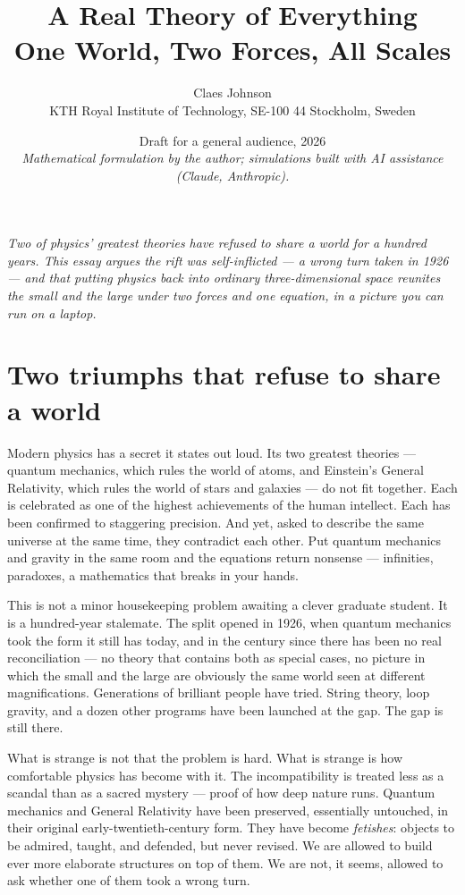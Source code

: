 \documentclass[11pt]{article}
\title{\textbf{A Real Theory of Everything}\\[0.3em]
\large One World, Two Forces, All Scales}
\author{Claes Johnson \\ \small KTH Royal Institute of Technology, SE-100 44 Stockholm, Sweden}
\date{\small Draft for a general audience, 2026 \\[0.3em]
\small\textit{Mathematical formulation by the author; simulations built with AI assistance (Claude, Anthropic).}}
\begin{document}
\maketitle
\thispagestyle{empty}

\noindent\textit{Two of physics' greatest theories have refused to share a world for a hundred
years. This essay argues the rift was self-inflicted --- a wrong turn taken in 1926 --- and that
putting physics back into ordinary three-dimensional space reunites the small and the large under
two forces and one equation, in a picture you can run on a laptop.}

\section*{Two triumphs that refuse to share a world}

Modern physics has a secret it states out loud. Its two greatest theories --- quantum mechanics,
which rules the world of atoms, and Einstein's General Relativity, which rules the world of stars
and galaxies --- do not fit together. Each is celebrated as one of the highest achievements of the
human intellect. Each has been confirmed to staggering precision. And yet, asked to describe the
same universe at the same time, they contradict each other. Put quantum mechanics and gravity in
the same room and the equations return nonsense --- infinities, paradoxes, a mathematics that
breaks in your hands.

This is not a minor housekeeping problem awaiting a clever graduate student. It is a hundred-year
stalemate. The split opened in 1926, when quantum mechanics took the form it still has today, and
in the century since there has been no real reconciliation --- no theory that contains both as
special cases, no picture in which the small and the large are obviously the same world seen at
different magnifications. Generations of brilliant people have tried. String theory, loop gravity,
and a dozen other programs have been launched at the gap. The gap is still there.

What is strange is not that the problem is hard. What is strange is how comfortable physics has
become with it. The incompatibility is treated less as a scandal than as a sacred mystery ---
proof of how deep nature runs. Quantum mechanics and General Relativity have been preserved,
essentially untouched, in their original early-twentieth-century form. They have become
\emph{fetishes}: objects to be admired, taught, and defended, but never revised. We are allowed to
build ever more elaborate structures on top of them. We are not, it seems, allowed to ask whether
one of them took a wrong turn.
\end{document}
